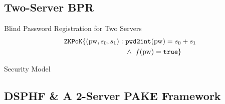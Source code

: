 \documentclass[notes,xcolor=dvipsnames]{beamer}
\begin{document}

\subsection{Two-Server BPR}

\begin{frame}{Blind Password Registration for Two Servers}
  \begin{align*}
    \mathtt{ZKPoK}\{(\mathrm{pw}, s_0, s_1):~ &\mathtt{pwd2int}(\mathrm{pw})=s_0 + s_1 \\
    & \wedge ~ f(\mathrm{pw})=\mathtt{true}\}
  \end{align*}
\end{frame}

\begin{frame}{Security Model}
  
\end{frame}

\subsection{DSPHF \& A 2-Server PAKE Framework}
\end{document}
